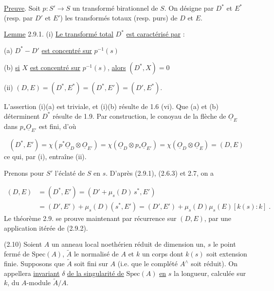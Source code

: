 \underline{Preuve}. Soit $p : S' \longrightarrow S$ un transformé birationnel de $S$. On désigne par $D^*$ et $E^*$ (resp. par $D'$ et $E'$) les transformés totaux (resp. purs) de $D$ et $E$.



\underline{Lemme} 2.9.1. (i) \underline{Le transformé total} $D^*$ \underline{est caractérisé par} :

(a) $D^* - D'$ \underline{est concentré sur} $p^{-1}(s)$

(b) \underline{si} $X$ \underline{est concentré sur} $p^{-1}(s)$, \underline{alors} $(D^*,X) = 0$

(ii) $(D,E) = (D^*,E^*) = (D^*,E') = (D',E^*)$.

L'assertion (i)(a) est triviale, et (i)(b) résulte de 1.6 (vi). Que (a) et (b) déterminent $D^*$ résulte de 1.9. Par construction, le conoyau de la flèche de $\underline{O}_E$ dans $p_* \underline{O}_{E'}$ est fini, d'où

\begin{equation*}
(D^*,E') = \chi(p^*\underline{O}_D \otimes \underline{O}_{E'}) = \chi(\underline{O}_D \otimes p_* \underline{O}_{E'}) = \chi(\underline{O}_D \otimes \underline{O}_E) = (D,E)
\end{equation*}
ce qui, par (i), entraîne (ii).

Prenons pour $S'$ l'éclaté de $S$ en $s$. D'après (2.9.1), (2.6.3) et 2.7, on a

\begin{equation}\tag{2.9.2}
\begin{aligned} (D,E) &= (D^*,E') = (D' + \mu_s(D)\, s^*,E')\\ &= (D',E') + \mu_s(D)(s^*,E') = (D',E') + \mu_s(D)\mu_s(E)[k(s):k] \;. \end{aligned}
\end{equation}
Le théorème 2.9. se prouve maintenant par récurrence sur $(D,E)$, par une application itérée de (2.9.2).

(2.10) Soient $A$ un anneau local noethérien réduit de dimension un, $s$ le point fermé de $\mathrm{Spec}(A)$, $\tilde{A}$ le normalisé de $A$ et $k$ un corps dont $k(s)$ soit extension finie. Supposons que $\tilde{A}$ soit fini sur $A$ (i.e. que le complété $A^{\wedge}$ soit réduit). On appellera \underline{invariant} $\delta$ \underline{de la singularité de} $\mathrm{Spec}(A)$ \underline{en} $s$ la longueur, calculée sur $k$, du $A$-module $\tilde{A}/A$.




